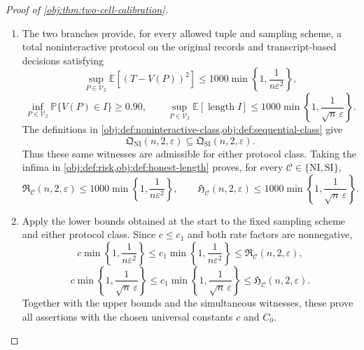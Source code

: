 \begin{proof}[Proof of \cref{obj:thm:two-cell-calibration}]
\begin{enumerate}
Finally, the upper endpoint is at most \(T+q_{\mathrm{cal}}\), and the lower endpoint is at least \(T-q_{\mathrm{cal}}\). Consequently,
\[
\operatorname{length}I
\le2q_{\mathrm{cal}}
=\frac{200}{\sqrt n\,\varepsilon},
\]
and, under the probability decision law,
\[
\mathbb E[\operatorname{length}I]
\le\frac{200}{\sqrt n\,\varepsilon}
\le\frac{1000}{\sqrt n\,\varepsilon}.
\]
This completes the simultaneous attainment bounds in the branch \(t>1\).

\item
The two branches provide, for every allowed tuple and sampling scheme, a total noninteractive protocol on the original records and transcript-based decisions satisfying
\[
\sup_{P\in\mathcal V_2}\mathbb E[(T-V(P))^2]
\le1000\min\left\{1,\frac1{n\varepsilon^2}\right\},
\]
\[
\inf_{P\in\mathcal V_2}\mathbb P\{V(P)\in I\}\ge0.90,
\qquad
\sup_{P\in\mathcal V_2}\mathbb E[\operatorname{length}I]
\le1000\min\left\{1,\frac1{\sqrt n\,\varepsilon}\right\}.
\]
The definitions in
\cref{obj:def:noninteractive-class,obj:def:sequential-class} give
\[
\mathfrak Q_{\mathrm{NI}}(n,2,\varepsilon)
\subseteq
\mathfrak Q_{\mathrm{SI}}(n,2,\varepsilon).
\]
Thus these same witnesses are admissible for either protocol class. Taking the infima in
\cref{obj:def:risk,obj:def:honest-length} proves, for every
\(\mathcal C\in\{\mathrm{NI},\mathrm{SI}\}\),
\[
\mathfrak R_{\mathcal C}(n,2,\varepsilon)
\le1000\min\left\{1,\frac1{n\varepsilon^2}\right\},
\qquad
\mathfrak H_{\mathcal C}(n,2,\varepsilon)
\le1000\min\left\{1,\frac1{\sqrt n\,\varepsilon}\right\}.
\]

\item
Apply the lower bounds obtained at the start to the fixed sampling scheme and either protocol class. Since \(c\le c_1\) and both rate factors are nonnegative,
\[
c\min\left\{1,\frac1{n\varepsilon^2}\right\}
\le
c_1\min\left\{1,\frac1{n\varepsilon^2}\right\}
\le\mathfrak R_{\mathcal C}(n,2,\varepsilon),
\]
\[
c\min\left\{1,\frac1{\sqrt n\,\varepsilon}\right\}
\le
c_1\min\left\{1,\frac1{\sqrt n\,\varepsilon}\right\}
\le\mathfrak H_{\mathcal C}(n,2,\varepsilon).
\]
Together with the upper bounds and the simultaneous witnesses, these prove all assertions with the chosen universal constants \(c\) and \(C_0\).
\end{enumerate}
\end{proof}

